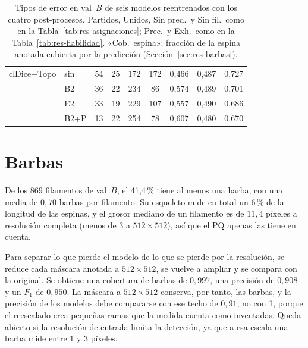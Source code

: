 \begin{table}[htbp]
\begin{tabular}{@{}llccccccc@{}}
clDice+Topo & sin  & 54  & 25 & 172 & 172 & 0,466 & 0,487 & 0,727\\
            & B2   & 36  & 22 & 234 & 86  & 0,574 & 0,489 & 0,701\\
            & E2   & 33  & 19 & 229 & 107 & 0,557 & 0,490 & 0,686\\
            & B2+P & 13  & 22 & 254 & 78  & 0,607 & 0,480 & 0,670\\
\bottomrule
\end{tabular}
\caption{Tipos de error en val~$B$ de seis modelos reentrenados con los
cuatro post-procesos. Partidos, Unidos, Sin pred.\ y Sin fil.\ como en
la Tabla~\ref{tab:res-asignaciones}; Prec.\ y Exh.\ como en la
Tabla~\ref{tab:res-fiabilidad}. «Cob.\ espina»: fracción de la espina
anotada cubierta por la predicción (Sección~\ref{sec:res-barbas}).}
\label{tab:res-e2-errores}
\end{table}

\section{Barbas}
\label{sec:anx-barbas}

De los 869 filamentos de val~$B$, el 41,4\,\% tiene al menos una barba,
con una media de $0{,}70$ barbas por filamento. Su esqueleto mide en
total un 6\,\% de la longitud de las espinas, y el grosor mediano de un
filamento es de $11{,}4$ píxeles a resolución completa (menos de 3 a
$512\times512$), así que el PQ apenas las tiene en cuenta.

Para separar lo que pierde el modelo de lo que se pierde por la
resolución, se reduce cada máscara anotada a $512\times512$, se vuelve a
ampliar y se compara con la original. Se obtiene una cobertura de barbas
de $0{,}997$, una precisión de $0{,}908$ y un $F_1$ de $0{,}950$. La
máscara a $512\times512$ conserva, por tanto, las barbas, y la precisión
de los modelos debe compararse con ese techo de $0{,}91$, no con 1,
porque el reescalado crea pequeñas ramas que la medida cuenta como
inventadas. Queda abierto si la resolución de entrada limita la
detección, ya que a esa escala una barba mide entre 1 y 3 píxeles.

